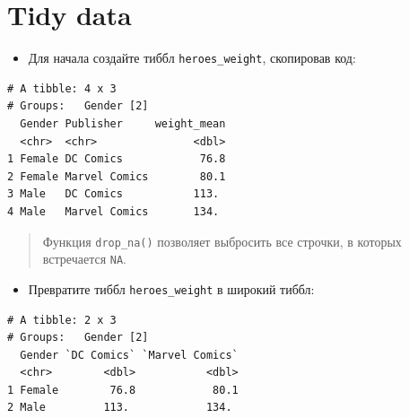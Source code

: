 \documentclass[
]{book}
\newenvironment{Shaded}{\begin{snugshade}}{\end{snugshade}}
\newcommand{\DataTypeTok}[1]{\textcolor[rgb]{0.13,0.29,0.53}{#1}}
\newcommand{\KeywordTok}[1]{\textcolor[rgb]{0.13,0.29,0.53}{\textbf{#1}}}
\newcommand{\NormalTok}[1]{#1}
\newcommand{\OperatorTok}[1]{\textcolor[rgb]{0.81,0.36,0.00}{\textbf{#1}}}
\newcommand{\OtherTok}[1]{\textcolor[rgb]{0.56,0.35,0.01}{#1}}
\newcommand{\StringTok}[1]{\textcolor[rgb]{0.31,0.60,0.02}{#1}}
\providecommand{\tightlist}{%
  \setlength{\itemsep}{0pt}\setlength{\parskip}{0pt}}
\begin{document}
\hypertarget{task_join}{%
\section{Tidy data}\label{task_join}}

\begin{itemize}
\tightlist
\item
  Для начала создайте тиббл \texttt{heroes\_weight}, скопировав код:
\end{itemize}

\begin{Shaded}
\end{Shaded}

\begin{verbatim}
# A tibble: 4 x 3
# Groups:   Gender [2]
  Gender Publisher     weight_mean
  <chr>  <chr>               <dbl>
1 Female DC Comics            76.8
2 Female Marvel Comics        80.1
3 Male   DC Comics           113. 
4 Male   Marvel Comics       134. 
\end{verbatim}

\begin{quote}
Функция \texttt{drop\_na()} позволяет выбросить все строчки, в которых встречается \texttt{NA}.
\end{quote}

\begin{itemize}
\tightlist
\item
  Превратите тиббл \texttt{heroes\_weight} в широкий тиббл:
\end{itemize}

\begin{verbatim}
# A tibble: 2 x 3
# Groups:   Gender [2]
  Gender `DC Comics` `Marvel Comics`
  <chr>        <dbl>           <dbl>
1 Female        76.8            80.1
2 Male         113.            134. 
\end{verbatim}
\end{document}
